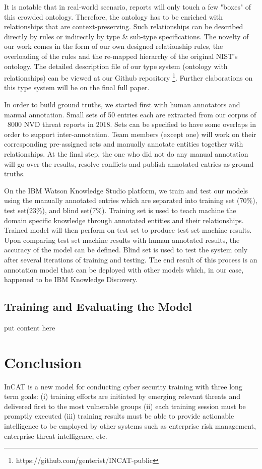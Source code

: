 \documentclass{article} %
\begin{document}
It is notable that in real-world scenario, reports will only touch a few "boxes" of this crowded ontology. Therefore, the ontology has to be enriched with relationships that are context-preserving. Such relationships can be described directly by rules or indirectly by type \& sub-type specifications. The novelty of our work comes in the form of our own designed relationship rules, the overloading of the rules and the re-mapped hierarchy of the original NIST's ontology. The detailed description file of our type system (ontology with relationships) can be viewed at our Github repository \footnote{https://github.com/genterist/INCAT-public}. Further elaborations on this type system will be on the final full paper.

In order to build ground truths, we started first with human annotators and manual annotation. Small sets of 50 entries each are extracted from our corpus of ~8000 NVD threat reports in 2018. Sets can be specified to have some overlaps in order to support inter-annotation. Team members (except one) will work on their corresponding pre-assigned sets and manually annotate entities together with relationships. At the final step, the one who did not do any manual annotation will go over the results, resolve conflicts and publish annotated entries as ground truths.

On the IBM Watson Knowledge Studio platform, we train and test our models using the manually annotated entries which are separated into training set (70\%), test set(23\%), and blind set(7\%). Training set is used to teach machine the domain specific knowledge through annotated entities and their relationships. Trained model will then perform on test set to produce test set machine results. Upon comparing test set machine results with human annotated results, the accuracy of the model can be defined. Blind set is used to test the system only after several iterations of training and testing. The end result of this process is an annotation model that can be deployed with other models which, in our case, happened to be IBM Knowledge Discovery.

\subsection{Training and Evaluating the Model}
put content here

\section{Conclusion}
InCAT is a new model for conducting cyber security training with three long term goals: (i) training efforts are initiated by emerging relevant threats and delivered first to the most vulnerable groups (ii) each training session must be promptly executed (iii) training results must be able to provide actionable intelligence to be employed by other systems such as enterprise risk management, enterprise threat intelligence, etc.
\end{document}
